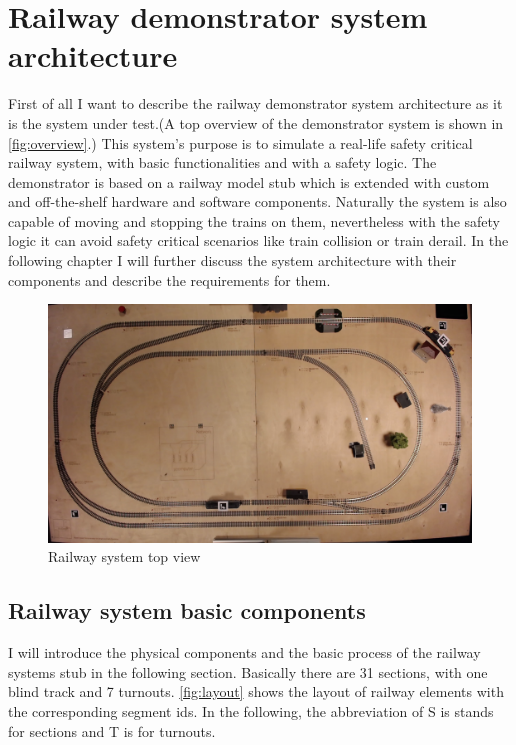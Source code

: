 \chapter{Railway demonstrator system architecture}\label{chapter:RailwaySystem}
First of all I want to describe the railway demonstrator system architecture as it is the system under test.(A top overview of the demonstrator system is shown in \autoref{fig:overview}.) This system's purpose is to simulate a real-life safety critical railway system, with basic functionalities and with a safety logic. The demonstrator is based on a railway model stub which is extended with custom and off-the-shelf hardware and software components. Naturally the system is also capable of moving and stopping the trains on them, nevertheless with the safety logic it can avoid safety critical scenarios like train collision or train derail. In the following chapter I will further discuss the system architecture with their components and describe the requirements for them.
\begin{figure}[h]
	\centering
	\includegraphics[width=150mm, keepaspectratio, angle = 180]{figures/modes3/overview.jpg}
	\caption{Railway system top view}
	\label{fig:overview}
\end{figure}

\section{Railway system basic components}
I will introduce the physical components and the basic process of the railway systems stub in the following section. Basically there are 31 sections, with one blind track and 7 turnouts. \autoref{fig:layout} shows the layout of railway elements with the corresponding segment ids. In the following, the abbreviation of S is stands for sections and T is for turnouts.

